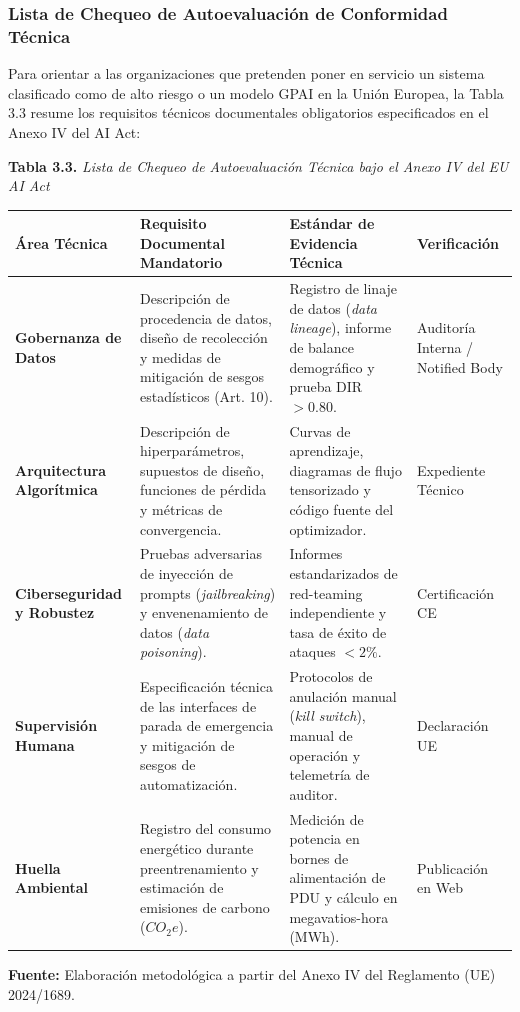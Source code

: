 \subsubsection{Lista de Chequeo de Autoevaluación de Conformidad Técnica}

Para orientar a las organizaciones que pretenden poner en servicio un sistema clasificado como de alto riesgo o un modelo GPAI en la Unión Europea, la Tabla 3.3 resume los requisitos técnicos documentales obligatorios especificados en el Anexo IV del AI Act:

\begin{table}[htbp]
\centering
\small
\textbf{Tabla 3.3.} \textit{Lista de Chequeo de Autoevaluación Técnica bajo el Anexo IV del EU AI Act}\\[0.25cm]
\label{tab:checklist_conformidad}
\begin{tabularx}{\textwidth}{p{2.8cm} p{4.5cm} p{4.2cm} p{2.5cm}}
\toprule
\textbf{Área Técnica} & \textbf{Requisito Documental Mandatorio} & \textbf{Estándar de Evidencia Técnica} & \textbf{Verificación} \\
\midrule
\textbf{Gobernanza de Datos} & Descripción de procedencia de datos, diseño de recolección y medidas de mitigación de sesgos estadísticos (Art. 10). & Registro de linaje de datos (\textit{data lineage}), informe de balance demográfico y prueba DIR $> 0.80$. & Auditoría Interna / Notified Body \\
\addlinespace
\textbf{Arquitectura Algorítmica} & Descripción de hiperparámetros, supuestos de diseño, funciones de pérdida y métricas de convergencia. & Curvas de aprendizaje, diagramas de flujo tensorizado y código fuente del optimizador. & Expediente Técnico \\
\addlinespace
\textbf{Ciberseguridad y Robustez} & Pruebas adversarias de inyección de prompts (\textit{jailbreaking}) y envenenamiento de datos (\textit{data poisoning}). & Informes estandarizados de red-teaming independiente y tasa de éxito de ataques $< 2\%$. & Certificación CE \\
\addlinespace
\textbf{Supervisión Humana} & Especificación técnica de las interfaces de parada de emergencia y mitigación de sesgos de automatización. & Protocolos de anulación manual (\textit{kill switch}), manual de operación y telemetría de auditor. & Declaración UE \\
\addlinespace
\textbf{Huella Ambiental} & Registro del consumo energético durante preentrenamiento y estimación de emisiones de carbono ($CO_2e$). & Medición de potencia en bornes de alimentación de PDU y cálculo en megavatios-hora (MWh). & Publicación en Web \\
\bottomrule
\end{tabularx}
\begin{center}
\scriptsize \textbf{Fuente:} Elaboración metodológica a partir del Anexo IV del Reglamento (UE) 2024/1689.
\end{center}
\end{table}

